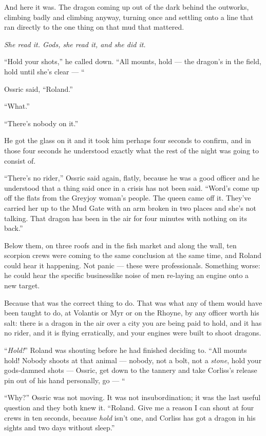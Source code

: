 And here it was. The dragon coming up out of the dark behind the outworks, climbing badly and climbing anyway, turning once and settling onto a line that ran directly to the one thing on that mud that mattered.

\textit{She read it. Gods, she read it, and she did it.}

“Hold your shots,” he called down. “All mounts, hold — the dragon’s in the field, hold until she’s clear — “

Ossric said, “Roland.”

“What.”

“There’s nobody on it.”

\sceneBreak

He got the glass on it and it took him perhaps four seconds to confirm, and in those four seconds he understood exactly what the rest of the night was going to consist of.

“There’s no rider,” Ossric said again, flatly, because he was a good officer and he understood that a thing said once in a crisis has not been said. “Word’s come up off the flats from the Greyjoy woman’s people. The queen came off it. They’ve carried her up to the Mud Gate with an arm broken in two places and she’s not talking. That dragon has been in the air for four minutes with nothing on its back.”

Below them, on three roofs and in the fish market and along the wall, ten scorpion crews were coming to the same conclusion at the same time, and Roland could hear it happening. Not panic — these were professionals. Something worse: he could hear the specific businesslike noise of men re-laying an engine onto a new target.

Because that was the correct thing to do. That was what any of them would have been taught to do, at Volantis or Myr or on the Rhoyne, by any officer worth his salt: there is a dragon in the air over a city you are being paid to hold, and it has no rider, and it is flying erratically, and your engines were built to shoot dragons.

“\textit{Hold!}” Roland was shouting before he had finished deciding to. “All mounts hold! Nobody shoots at that animal — nobody, not a bolt, not a \textit{stone}, hold your gods-damned shots — Ossric, get down to the tannery and take Corliss’s release pin out of his hand personally, go — “

“Why?” Ossric was not moving. It was not insubordination; it was the last useful question and they both knew it. “Roland. Give me a reason I can shout at four crews in ten seconds, because \textit{hold} isn’t one, and Corliss has got a dragon in his sights and two days without sleep.”

